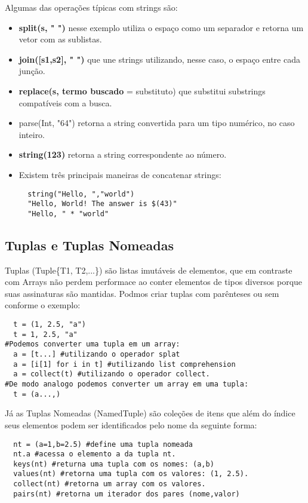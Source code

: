 Algumas das operações típicas com strings são:
\begin{itemize}
    \item \textbf{split(s, " ")} nesse exemplo utiliza o espaço como um separador e retorna um vetor com as sublistas.
    \item \textbf{join([s1,s2], " ")} que une strings utilizando, nesse caso, o espaço entre cada junção.
    \item \textbf{replace(s, {termo buscado}} =  {substituto}) que substitui substrings compatíveis com a busca.
    \item parse(Int, "64") retorna a string convertida para um tipo numérico, no caso inteiro.
    \item \textbf{string(123)} retorna a string correspondente ao número.
    \item Existem três principais maneiras de concatenar strings:
        \subitem 
        \begin{lstlisting}    
  string("Hello, ","world")
  "Hello, World! The answer is $(43)"
  "Hello, " * "world"
        \end{lstlisting}
        
\end{itemize}



\subsection{Tuplas e Tuplas Nomeadas}
Tuplas (Tuple\{T1, T2,...\}) são listas imutáveis de elementos, que em contraste com Arrays não perdem performace ao conter elementos de tipos diversos porque suas assinaturas são mantidas. Podmos criar tuplas com parênteses ou sem conforme o exemplo:
\begin{lstlisting}
  t = (1, 2.5, "a")
  t = 1, 2.5, "a"
#Podemos converter uma tupla em um array:
  a = [t...] #utilizando o operador splat
  a = [i[1] for i in t] #utilizando list comprehension
  a = collect(t) #utilizando o operador collect. 
#De modo analogo podemos converter um array em uma tupla:
  t = (a...,)
\end{lstlisting}  
Já as Tuplas Nomeadas (NamedTuple) são coleções de itens que além do índice seus elementos podem ser identificados pelo nome da seguinte forma: 
\begin{lstlisting}
  nt = (a=1,b=2.5) #define uma tupla nomeada
  nt.a #acessa o elemento a da tupla nt.
  keys(nt) #returna uma tupla com os nomes: (a,b)
  values(nt) #retorna uma tupla com os valores: (1, 2.5).
  collect(nt) #retorna um array com os valores.
  pairs(nt) #retorna um iterador dos pares (nome,valor) 
\end{lstlisting}

